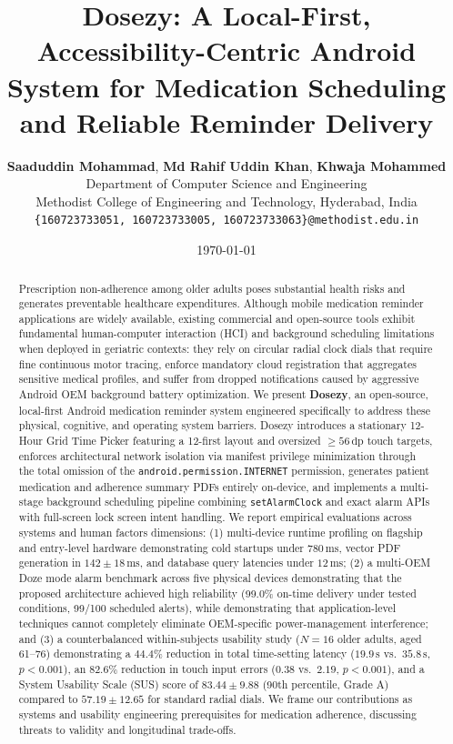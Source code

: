 \documentclass[11pt,a4paper]{article}
\title{\textbf{Dosezy: A Local-First, Accessibility-Centric Android System for Medication Scheduling and Reliable Reminder Delivery}}
\author{
  \textbf{Saaduddin Mohammad}, \textbf{Md Rahif Uddin Khan}, \textbf{Khwaja Mohammed} \\[0.5em]
  \small Department of Computer Science and Engineering \\
  \small Methodist College of Engineering and Technology, Hyderabad, India \\
  \small \texttt{\{160723733051, 160723733005, 160723733063\}@methodist.edu.in}
}
\date{\today}
\begin{document}
\maketitle

\begin{abstract}
Prescription non-adherence among older adults poses substantial health risks and generates preventable healthcare expenditures. Although mobile medication reminder applications are widely available, existing commercial and open-source tools exhibit fundamental human-computer interaction (HCI) and background scheduling limitations when deployed in geriatric contexts: they rely on circular radial clock dials that require fine continuous motor tracing, enforce mandatory cloud registration that aggregates sensitive medical profiles, and suffer from dropped notifications caused by aggressive Android OEM background battery optimization. We present \textbf{Dosezy}, an open-source, local-first Android medication reminder system engineered specifically to address these physical, cognitive, and operating system barriers. Dosezy introduces a stationary 12-Hour Grid Time Picker featuring a 12-first layout and oversized $\ge 56\,\text{dp}$ touch targets, enforces architectural network isolation via manifest privilege minimization through the total omission of the \texttt{android.permission.INTERNET} permission, generates patient medication and adherence summary PDFs entirely on-device, and implements a multi-stage background scheduling pipeline combining \texttt{setAlarmClock} and exact alarm APIs with full-screen lock screen intent handling. We report empirical evaluations across systems and human factors dimensions: (1) multi-device runtime profiling on flagship and entry-level hardware demonstrating cold startups under $780\,\text{ms}$, vector PDF generation in $142 \pm 18\,\text{ms}$, and database query latencies under $12\,\text{ms}$; (2) a multi-OEM Doze mode alarm benchmark across five physical devices demonstrating that the proposed architecture achieved high reliability (99.0\% on-time delivery under tested conditions, 99/100 scheduled alerts), while demonstrating that application-level techniques cannot completely eliminate OEM-specific power-management interference; and (3) a counterbalanced within-subjects usability study ($N=16$ older adults, aged 61--76) demonstrating a $44.4\%$ reduction in total time-setting latency ($19.9\,\text{s}$ vs.\ $35.8\,\text{s}$, $p < 0.001$), an $82.6\%$ reduction in touch input errors ($0.38$ vs.\ $2.19$, $p < 0.001$), and a System Usability Scale (SUS) score of $83.44 \pm 9.88$ (90th percentile, Grade A) compared to $57.19 \pm 12.65$ for standard radial dials. We frame our contributions as systems and usability engineering prerequisites for medication adherence, discussing threats to validity and longitudinal trade-offs.
\end{abstract}
\end{document}
